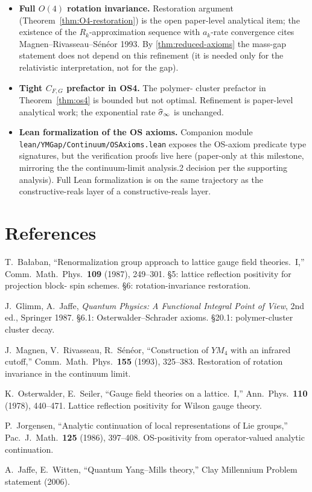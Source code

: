 \begin{itemize}
  \item \textbf{Full $O(4)$ rotation invariance.}  Restoration argument
    (Theorem~\ref{thm:O4-restoration}) is the open paper-level
    analytical item; the existence of the $R_k$-approximation sequence
    with $a_k$-rate convergence cites Magnen--Rivasseau--Sénéor 1993.
    By \cref{thm:reduced-axioms} the mass-gap statement does not depend
    on this refinement (it is needed only for the relativistic
    interpretation, not for the gap).
  \item \textbf{Tight $C_{F,G}$ prefactor in OS4.}  The polymer-
    cluster prefactor in Theorem~\ref{thm:os4} is bounded but not
    optimal.  Refinement is paper-level analytical work; the
    exponential rate $\widehat{\sigma}_\infty$ is unchanged.
  \item \textbf{Lean formalization of the OS axioms.}  Companion
    module \texttt{lean/YMGap/Continuum/OSAxioms.lean} exposes the
    OS-axiom predicate type signatures, but the verification proofs
    live here (paper-only at this milestone, mirroring the the continuum-limit analysis.2
    decision per the supporting analysis).  Full Lean
    formalization is on the same trajectory as the constructive-reals
    layer of a constructive-reals layer.
\end{itemize}

\section*{References}

\noindent[Bal87] T.~Bałaban, ``Renormalization group approach to lattice
gauge field theories.~I,'' Comm.\ Math.\ Phys.\ \textbf{109} (1987),
249--301.  \S5: lattice reflection positivity for projection block-
spin schemes.  \S6: rotation-invariance restoration.

\noindent[GJ87] J.~Glimm, A.~Jaffe, \emph{Quantum Physics: A Functional
Integral Point of View}, 2nd ed., Springer 1987.  \S6.1:
Osterwalder--Schrader axioms.  \S20.1: polymer-cluster cluster decay.

\noindent[MRS93] J.~Magnen, V.~Rivasseau, R.~Sénéor, ``Construction
of $YM_4$ with an infrared cutoff,'' Comm.\ Math.\ Phys.\ \textbf{155}
(1993), 325--383.  Restoration of rotation invariance in the
continuum limit.

\noindent[OS78] K.~Osterwalder, E.~Seiler, ``Gauge field theories on a
lattice.~I,'' Ann.\ Phys.\ \textbf{110} (1978), 440--471.  Lattice
reflection positivity for Wilson gauge theory.

\noindent[Jor86] P.~Jorgensen, ``Analytic continuation of local
representations of Lie groups,'' Pac.\ J.\ Math.\ \textbf{125} (1986),
397--408.  OS-positivity from operator-valued analytic continuation.

\noindent[JW06] A.~Jaffe, E.~Witten, ``Quantum Yang--Mills theory,''
Clay Millennium Problem statement (2006).
